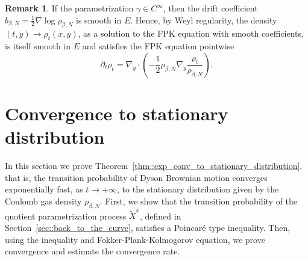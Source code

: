 \documentclass[11pt]{article}
\numberwithin{equation}{section}
\theoremstyle{definition}
\newtheorem{remark}[theorem]{Remark}
\begin{document}
\begin{remark}
    If the parametrization $\gamma \in C^{\infty}$, then the drift coefficient $b_{\beta,N}=\frac{1}{2}\nabla\log\rho_{\beta, N}$ is smooth in $E$. Hence, by Weyl regularity, the density $(t,y)\to\rho_{t}(x,y)$, as a solution to the FPK equation with smooth coefficients, is itself smooth in $E$ and satisfies the FPK equation pointwise
\[
    \partial_{t}\rho_{t} = \nabla_{y}\cdot \left(-\frac{1}{2}\rho_{\beta, N}\nabla_{y}\frac{\rho_{t}}{\rho_{\beta, N}}\right).
\]
\end{remark}

\section{Convergence to stationary distribution}\label{sec::ergodicity}
In this section we prove Theorem~\ref{thm::exp_conv_to_stationary_distribution}, that is, the transition probability of Dyson Brownian motion converges exponentially fast, as $t\to+\infty$, to the stationary distribution given by the Coulomb gas density $\rho_{\beta, N}$. First, we show that the transition probability of the quotient parametrization process $\tilde{X}^{x}$, defined in Section~\ref{sec::back_to_the_curve}, satisfies a Poincaré type inequality. Then, using the inequality and Fokker-Plank-Kolmogorov equation, we prove convergence and estimate the convergence rate. 
\end{document}
